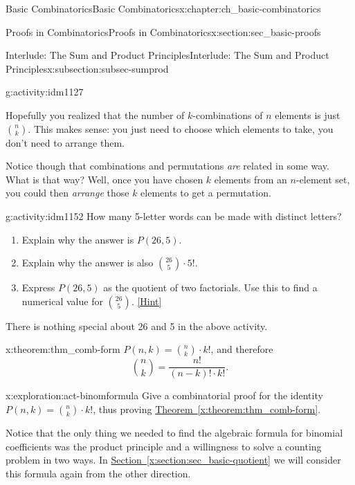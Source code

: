 \documentclass[oneside,10pt,]{book}
\numberwithin{equation}{chapter}
\begin{document}
\begin{chapterptx}{Basic Combinatorics}{}{Basic Combinatorics}{}{}{x:chapter:ch_basic-combinatorics}
\begin{sectionptx}{Proofs in Combinatorics}{}{Proofs in Combinatorics}{}{}{x:section:sec_basic-proofs}
\begin{subsectionptx}{Interlude: The Sum and Product Principles}{}{Interlude: The Sum and Product Principles}{}{}{x:subsection:subsec-sumprod}
\begin{activity}{}{g:activity:idm1127}
\end{activity}
Hopefully you realized that the number of \(k\)-combinations of \(n\) elements is just \(\binom{n}{k}\).  This makes sense: you just need to choose which elements to take, you don't need to arrange them.%
\par
Notice though that combinations and permutations \emph{are} related in some way.  What is that way?  Well, once you have chosen \(k\) elements from an \(n\)-element set, you could then \emph{arrange} those \(k\) elements to get a permutation.%
\begin{activity}{}{g:activity:idm1152}%
How many 5-letter words can be made with distinct letters?%
\begin{enumerate}[font=\bfseries,label=(\alph*),ref=\alph*]
\item{}Explain why the answer is \(P(26,5)\).%
\item{}Explain why the answer is also \(\binom{26}{5}\cdot 5!\).%
\item{}Express \(P(26,5)\) as the quotient of two factorials.  Use this to find a numerical value for \(\binom{26}{5}\).%
\space\hspace*{0pt}\hfill{\tiny\hyperlink{g:hint:idm1166-back}{[Hint]}}\end{enumerate}
\end{activity}
There is nothing special about 26 and 5 in the above activity.%
\begin{theorem}{}{}{x:theorem:thm_comb-form}%
\(P(n,k) = \binom{n}{k}\cdot k!\), and therefore%
\begin{equation*}
\binom{n}{k} = \frac{n!}{(n-k)!\cdot k!}\text{.}
\end{equation*}
%
\end{theorem}
\begin{exploration}{}{x:exploration:act-binomformula}%
Give a combinatorial proof for the identity \(P(n,k) = \binom{n}{k}\cdot k!\), thus proving \hyperref[x:theorem:thm_comb-form]{Theorem~\ref{x:theorem:thm_comb-form}}.%
\end{exploration}
Notice that the only thing we needed to find the algebraic formula for binomial coefficients was the product principle and a willingness to solve a counting problem in two ways.  In \hyperref[x:section:sec_basic-quotient]{Section~\ref{x:section:sec_basic-quotient}} we will consider this formula again from the other direction.%
\end{subsectionptx}
%
%
\typeout{************************************************}
\typeout{************************************************}

\end{sectionptx}
\end{chapterptx}
\end{document}
